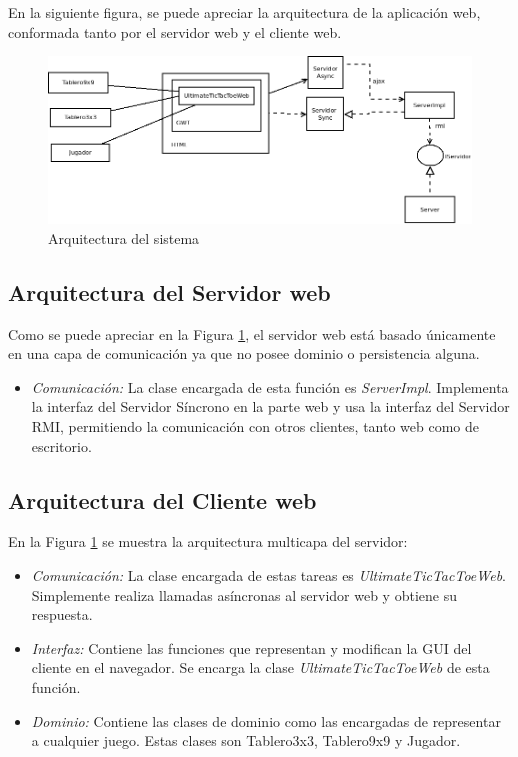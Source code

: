 En la siguiente figura, se puede apreciar la arquitectura de la aplicación web, conformada tanto por el servidor web y el cliente web.

 \begin{figure}[h]
 \centering
 \includegraphics[scale=0.55]{img/diagrama.png}
 \caption{Arquitectura del sistema}
 \label{arq_sistema}
 \end{figure}

\subsection{Arquitectura del Servidor web}

Como se puede apreciar en la Figura \ref{arq_sistema}, el servidor web está basado únicamente en una capa de comunicación ya que no posee dominio o persistencia alguna.

\begin{itemize}
  \item \emph{Comunicación:} La clase encargada de esta función es \emph{ServerImpl}. Implementa la interfaz del Servidor Síncrono en la parte web y usa la interfaz del Servidor RMI, permitiendo la comunicación con otros clientes, tanto web como de escritorio.
\end{itemize}

\subsection{Arquitectura del Cliente web}

En la Figura \ref{arq_sistema} se muestra la arquitectura multicapa del servidor:

\begin{itemize}
 \item \emph{Comunicación:} La clase encargada de estas tareas es \emph{UltimateTicTacToeWeb}. Simplemente realiza llamadas asíncronas al servidor web y obtiene su respuesta.
  \item \emph{Interfaz:} Contiene las funciones que representan y modifican la GUI del cliente en el navegador. Se encarga la clase \emph{UltimateTicTacToeWeb} de esta función.
 \item \emph{Dominio:} Contiene las clases de dominio como las encargadas de representar a cualquier juego. Estas clases son Tablero3x3, Tablero9x9 y Jugador.
\end{itemize}
